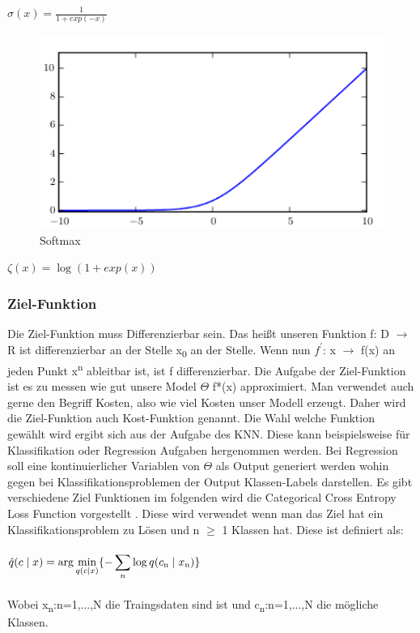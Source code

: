 \documentclass{llncs}
\begin{document}
\begin{math}
\sigma(x)=\frac{1}{1+exp(-x)}
\end{math}

\begin{figure}[htbp] 
	\centering
	\includegraphics[width=1.0\textwidth]{softmax.png}
	\caption{Softmax}
	\label{fig:Bild1}
\end{figure}

\begin{math}
\zeta(x) = \log(1+exp(x))
\end{math}
\subsubsection{Ziel-Funktion}

Die Ziel-Funktion muss Differenzierbar sein. Das heißt unseren Funktion f: D $\to$ R ist differenzierbar an der Stelle x\textsubscript{0} an der Stelle. Wenn nun $f^\prime$: x $\to$ f(x) an jeden Punkt x\textsuperscript{n} ableitbar ist, ist f differenzierbar. Die Aufgabe der Ziel-Funktion ist es zu messen wie gut unsere Model $\Theta$ f*(x) approximiert. Man verwendet auch gerne den Begriff Kosten, also wie viel Kosten unser Modell erzeugt. Daher wird die Ziel-Funktion auch Kost-Funktion genannt. Die Wahl welche Funktion gewählt wird ergibt sich aus der Aufgabe des KNN. Diese kann beispielsweise für Klassifikation oder Regression Aufgaben hergenommen werden. Bei Regression soll eine kontinuierlicher Variablen von $\Theta$ als Output generiert werden wohin gegen bei Klassifikationsproblemen der Output Klassen-Labels darstellen. Es gibt verschiedene Ziel Funktionen im folgenden wird die Categorical Cross Entropy Loss Function vorgestellt \cite{crossentropy}. Diese wird verwendet wenn man das Ziel hat ein Klassifikationsproblem zu Lösen und n $\geq$ 1 Klassen hat. Diese ist definiert als:
\\\\
\begin{math}
\hat{q}(c\mid x)=\displaystyle\arg\min_{q(c\mid  x)}\{-\displaystyle\sum_{n}{\log q(c\textsubscript{n}\mid x\textsubscript{n})}\}
\end{math}
\\\\
Wobei  x\textsubscript{n}:n=1,...,N die Traingsdaten sind ist und c\textsubscript{n}:n=1,...,N die mögliche Klassen.
\newpage
\end{document}
